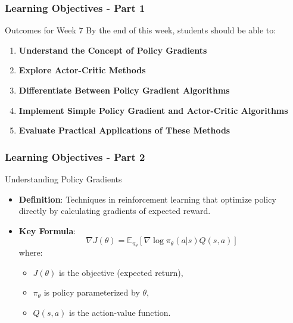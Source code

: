 \documentclass[aspectratio=169]{beamer}
\begin{document}
\begin{frame}[fragile]
    \frametitle{Learning Objectives - Part 1}
    \begin{block}{Outcomes for Week 7}
        By the end of this week, students should be able to:
    \end{block}
    
    \begin{enumerate}
        \item \textbf{Understand the Concept of Policy Gradients}
        \item \textbf{Explore Actor-Critic Methods}
        \item \textbf{Differentiate Between Policy Gradient Algorithms}
        \item \textbf{Implement Simple Policy Gradient and Actor-Critic Algorithms}
        \item \textbf{Evaluate Practical Applications of These Methods}
    \end{enumerate}
\end{frame}

\begin{frame}[fragile]
    \frametitle{Learning Objectives - Part 2}
    \begin{block}{Understanding Policy Gradients}
        \begin{itemize}
            \item \textbf{Definition}: Techniques in reinforcement learning that optimize policy directly by calculating gradients of expected reward.
            \item \textbf{Key Formula}:
            \begin{equation}
            \nabla J(\theta) = \mathbb{E}_{\pi_\theta}\left[\nabla \log \pi_\theta(a|s) Q(s, a)\right]
            \end{equation}
            where:
            \begin{itemize}
                \item \(J(\theta)\) is the objective (expected return),
                \item \(\pi_\theta\) is policy parameterized by \(\theta\),
                \item \(Q(s, a)\) is the action-value function.
            \end{itemize}
        \end{itemize}
    \end{block}
\end{frame}
\end{document}

